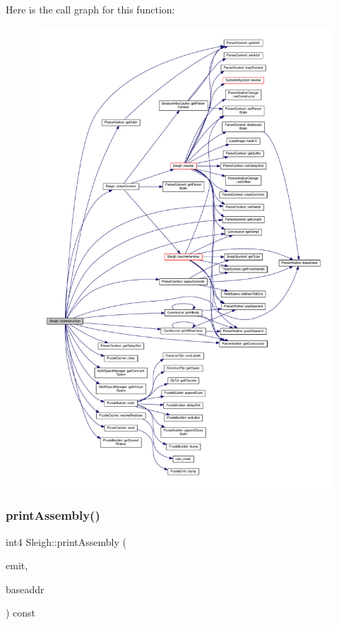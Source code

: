 Here is the call graph for this function\+:
\nopagebreak
\begin{figure}[H]
\begin{center}
\leavevmode
\includegraphics[width=350pt]{class_sleigh_a7221a746dae0e1acfd2189a192974fe0_cgraph}
\end{center}
\end{figure}
\mbox{\label{class_sleigh_a21c8622098202b1746bcda972d59d9aa}} 
\subsubsection{\texorpdfstring{printAssembly()}{printAssembly()}}
{\footnotesize\ttfamily int4 Sleigh\+::print\+Assembly (\begin{DoxyParamCaption}\item[{\mbox{\hyperlink{class_assembly_emit}{Assembly\+Emit}} \&}]{emit,  }\item[{const \mbox{\hyperlink{class_address}{Address}} \&}]{baseaddr }\end{DoxyParamCaption}) const\hspace{0.3cm}{\ttfamily [virtual]}}



